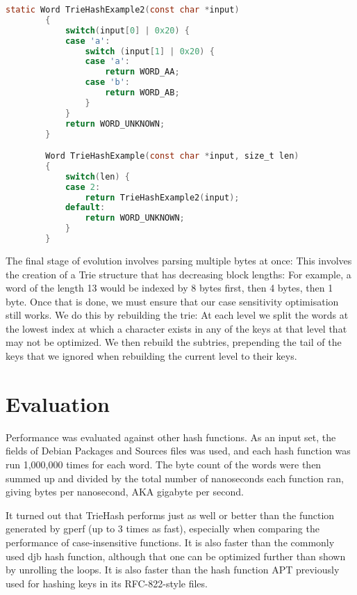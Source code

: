 \documentclass[parskip=half]{scrartcl}
\begin{document}
        \begin{lstlisting}[language=C,gobble=8,label=lst:ascii,caption=Case-Insensitive Length-Indexed TrieHash,frame=tb]
        static Word TrieHashExample2(const char *input)
        {
            switch(input[0] | 0x20) {
            case 'a':
                switch (input[1] | 0x20) {
                case 'a':
                    return WORD_AA;
                case 'b':
                    return WORD_AB;
                }
            }
            return WORD_UNKNOWN;
        }

        Word TrieHashExample(const char *input, size_t len)
        {
            switch(len) {
            case 2:
                return TrieHashExample2(input);
            default:
                return WORD_UNKNOWN;
            }
        }
    \end{lstlisting}


    The final stage of evolution involves parsing multiple bytes at once: This
    involves the creation of a Trie structure that has decreasing block lengths:
    For example, a word of the length 13 would be indexed by 8 bytes first, then
    4 bytes, then 1 byte. Once that is done, we must ensure that our case sensitivity
    optimisation still works. We do this by rebuilding the trie: At each level
    we split the words at the lowest index at which a character exists in any
    of the keys at that level that may not be optimized. We then rebuild the
    subtries, prepending the tail of the keys that we ignored when rebuilding
    the current level to their keys.

    
    
    \section{Evaluation}\label{eval}
Performance was evaluated against other hash functions. As an input set,
the fields of Debian Packages and Sources files was used, and each hash
function was run 1,000,000 times for each word. The byte count of the
words were then summed up and divided by the total number of nanoseconds
each function ran, giving bytes per nanosecond, AKA gigabyte per second.

It turned out that TrieHash performs just as well or better than the function
generated by gperf (up to 3 times as fast), especially when comparing the performance
of case-insensitive functions. It is also faster than the commonly used djb hash
function, although that one can be optimized further than shown by unrolling
the loops. It is also faster than the hash function APT previously used for
hashing keys in its RFC-822-style files.
\end{document}
